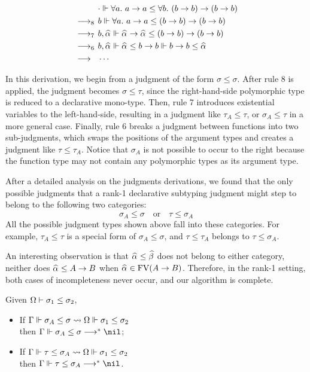 $$\begin{aligned}
           & \cdot \Vdash \all a \to a \le \all[b] (b \to b) \to (b \to b)\\
    \rrule{8} & b \Vdash \all a \to a \le (b \to b) \to (b \to b)\\
    \rrule{7} & b, \al \Vdash \al \to \al \le (b \to b) \to (b \to b)\\
    \rrule{6} & b, \al \Vdash \al \le b \to b \Vdash b \to b \le \al\\
    \rrule{} & \cdots
\end{aligned}$$

In this derivation, we begin from a judgment of the form $\sigma \le \sigma$.
After rule 8 is applied, the judgment becomes $\sigma \le \tau$,
since the right-hand-side polymorphic type is reduced to a declarative mono-type.
Then, rule 7 introduces existential variables to the left-hand-side,
resulting in a judgment like $\tau_A \le \tau$,
or $\sigma_A \le \tau$ in a more general case.
Finally, rule 6 breaks a judgment between functions into two sub-judgments,
which swaps the positions of the argument types
and creates a judgment like $\tau \le \tau_A$.
Notice that $\sigma_A$ is not possible to occur to the right
because the function type may not contain any polymorphic types as its argument type.

After a detailed analysis on the judgments derivations,
we found that the only possible judgments that a rank-1 declarative subtyping judgment
might step to belong to the following two categories:
$$\sigma_A \le \sigma \quad\text{or}\quad \tau \le \sigma_A$$
All the possible judgment types shown above fall into these categories.
For example, $\tau_A \le \tau$ is a special form of $\sigma_A \le \sigma$,
and $\tau \le \tau_A$ belongs to $\tau \le \sigma_A$.

An interesting observation is that $\al \le \bt$ does not belong to either category,
neither does $\al \le A \to B$ when $\al \in \text{FV}(A \to B)$.
Therefore, in the rank-1 setting, both cases of incompleteness never occur,
and our algorithm is complete.

\begin{theorem}
    Given $\Omega \vdash \sigma_1 \le \sigma_2$,
    \begin{itemize}
        \item If $\Gamma \Vdash \sigma_A \le \sigma \rightsquigarrow \Omega \Vdash \sigma_1 \le \sigma_2$
            \\then $\Gm \Vdash \sigma_A \le \sigma \redto \nil$;
        \item If $\Gamma \Vdash \tau \le \sigma_A \rightsquigarrow \Omega \Vdash \sigma_1 \le \sigma_2$
            \\then $\Gm \Vdash \tau \le \sigma_A \redto \nil$.
    \end{itemize}
\end{theorem}

